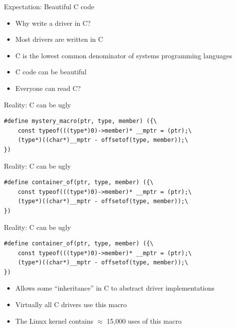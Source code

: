 \documentclass[NET,english,aspectratio=169,notitleframe,draft]{tumbeamer}
\begin{document}
\begin{frame}{Expectation: Beautiful C code}
\begin{itemize}
\item Why write a driver in C?
\pause
\vspace{1em}
\item Most drivers are written in C
\item C is the lowest common denominator of systems programming languages
\item C code can be beautiful
\item Everyone can read C?
\end{itemize}
\end{frame}

\begin{frame}[fragile]{Reality: C can be ugly}
\begin{verbatim}
#define mystery_macro(ptr, type, member) ({\
	const typeof(((type*)0)->member)* __mptr = (ptr);\
	(type*)((char*)__mptr - offsetof(type, member));\
})
\end{verbatim}
\end{frame}

\begin{frame}[fragile]{Reality: C can be ugly}
\begin{verbatim}
#define container_of(ptr, type, member) ({\
	const typeof(((type*)0)->member)* __mptr = (ptr);\
	(type*)((char*)__mptr - offsetof(type, member));\
})
\end{verbatim}
\end{frame}


\begin{frame}[fragile]{Reality: C can be ugly}
\begin{verbatim}
#define container_of(ptr, type, member) ({\
	const typeof(((type*)0)->member)* __mptr = (ptr);\
	(type*)((char*)__mptr - offsetof(type, member));\
})
\end{verbatim}
\begin{itemize}
\item Allows some ``inheritance'' in C to abstract driver implementations
\item Virtually all C drivers use this macro
\item The Linux kernel contains $\approx$ 15,000 uses of this macro
\end{itemize}
\end{frame}
\end{document}
